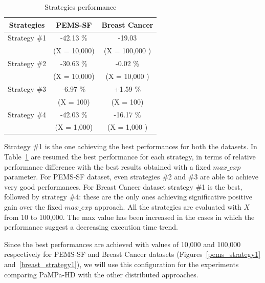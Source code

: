 \begin{table}
\begin{center}
\caption{Strategies performance}
\label{strategies_perf}
\begin{tabular}{ |c| c | c| }
\hline
 Strategies & PEMS-SF& Breast Cancer   \\ \hline
  Strategy \#1 &-42.13 \%   &    -19.03 \\ 
   &
 (X = 10,000)  &   (X = 100,000 )   \\ \hline
  Strategy \#2 & -30.63 \% &  -0.02 \%   \\ 
      & (X = 10,000)&  (X = 10,000 )    \\ \hline
  Strategy \#3 & -6.97 \%  & +1.59 \%   \\ 
      &  (X = 100)&  (X = 100)   \\ \hline
   Strategy \#4 & -42.03 \%
 &  -16.17 \%   \\ 
      &(X = 1,000) & (X = 1,000 )    \\ \hline
\end{tabular}
\end{center}
\end{table}

Strategy \#1 is the one achieving the best performances for both the datasets. In Table~\ref{strategies_perf} are resumed the best performance for each strategy, in terms of relative performance difference with the best results obtained with a fixed $max\_exp$ parameter. For PEMS-SF dataset, even strategies \#2 and \#3 are able to achieve very good performances. For Breast Cancer dataset strategy \#1 is the best, followed by strategy \#4: these are the only ones achieving significative positive gain over the fixed $max\_exp$ approach.
All the strategies are evaluated with $X$ from 10 to 100,000. The max value has been increased in the cases in which the performance suggest a decreasing execution time trend.

Since the best performances are achieved with values of 10,000 and 100,000 respectively for PEMS-SF and Breast Cancer datasets (Figures~\ref{pems_strategy1} and~\ref{breast_strategy1}), we will use this configuration for the experiments comparing PaMPa-HD with the other distributed approaches.



